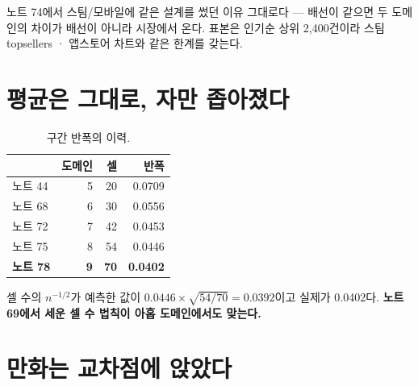 \documentclass[10pt]{article}
\begin{document}
노트 74에서 스팀/모바일에 같은 설계를 썼던 이유 그대로다 --- 배선이 같으면
두 도메인의 차이가 배선이 아니라 시장에서 온다. 표본은 인기순 상위 2,400건이라
스팀 topsellers · 앱스토어 차트와 같은 한계를 갖는다.

\section{평균은 그대로, 자만 좁아졌다}

\begin{table}[t]
\centering\tsize
\caption{구간 반폭의 이력.}
\begin{tabular}{lrrr}
\toprule
& 도메인 & 셀 & 반폭 \\
\midrule
노트 44 & 5 & 20 & 0.0709 \\
노트 68 & 6 & 30 & 0.0556 \\
노트 72 & 7 & 42 & 0.0453 \\
노트 75 & 8 & 54 & 0.0446 \\
\textbf{노트 78} & \textbf{9} & \textbf{70} & \textbf{0.0402} \\
\bottomrule
\end{tabular}
\end{table}

셀 수의 $n^{-1/2}$가 예측한 값이 $0.0446\times\sqrt{54/70}=0.0392$이고 실제가
0.0402다. \textbf{노트 69에서 세운 셀 수 법칙이 아홉 도메인에서도 맞는다.}


\section{만화는 교차점에 앉았다}
\end{document}
